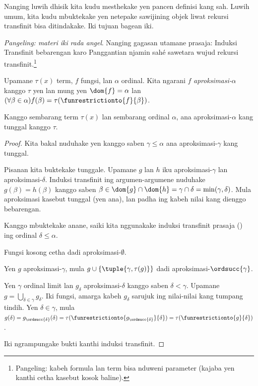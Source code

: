 \documentclass[../../../include/open-logic-section]{subfiles}
\begin{document}

Nanging luwih dhisik kita kudu mesthekake yen
 pancen definisi kang sah.
Luwih umum, kita kudu mbuktekake yen netepake
sawijining objek liwat rekursi transfinit bisa
ditindakake. Iki tujuan bagean iki.

\emph{Pangeling: materi iki rada angel}. Nanging
gagasan utamane prasaja: Induksi Transfinit bebarengan
karo Panggantian njamin sahé sawetara wujud rekursi
transfinit.\footnote{Pangeling: kabeh formula lan term
bisa nduweni parameter (kajaba yen kanthi cetha
kasebut kosok baline).}

\begin{defn}
	Upamane $\tau(x)$ term, $f$ fungsi, lan $\alpha$
	ordinal. Kita ngarani $f$ \emph{aproksimasi-$\alpha$}
	kanggo $\tau$ yen lan mung yen $\dom{f} = \alpha$
	lan $(\forall \beta \in \alpha)f(\beta)
	= \tau(\funrestrictionto{f}{\beta})$.
\end{defn}

\begin{lem}
Kanggo sembarang term $\tau(x)$ lan sembarang
ordinal $\alpha$, ana aproksimasi-$\alpha$ kang
tunggal kanggo $\tau$.
\end{lem}
\begin{proof}
Kita bakal nuduhake yen kanggo saben
$\gamma \leq \alpha$ ana aproksimasi-$\gamma$
kang tunggal.

Pisanan kita buktekake tunggale. Upamane $g$ lan $h$
iku aproksimasi-$\gamma$ lan aproksimasi-$\delta$.
Induksi transfinit ing argumen-argumene nuduhake
$g(\beta) = h(\beta)$ kanggo saben
$\beta \in \dom{g} \cap \dom{h}
= \gamma \cap \delta = \min(\gamma, \delta)$.
Mula aproksimasi kasebut tunggal (yen ana), lan
padha ing kabeh nilai kang dienggo bebarengan.

Kanggo mbuktekake anane, saiki kita nggunakake
induksi transfinit prasaja
()
ing ordinal $\delta \leq \alpha$.

Fungsi kosong cetha dadi aproksimasi-$\emptyset$.

Yen $g$ aproksimasi-$\gamma$, mula
$g \cup \{\tuple{\gamma, \tau(g)}\}$ dadi
aproksimasi-$\ordsucc{\gamma}$.

Yen $\gamma$ ordinal limit lan $g_\delta$
aproksimasi-$\delta$ kanggo saben $\delta < \gamma$.
Upamane $g = \bigcup_{\delta \in \gamma} g_\delta$.
Iki fungsi, amarga kabeh $g_\delta$ sarujuk
ing nilai-nilai kang tumpang tindih. Yen
$\delta \in \gamma$, mula
$g(\delta) = g_{\ordsucc{\delta}}(\delta)
= \tau(\funrestrictionto{g_{\ordsucc{\delta}}}{\delta})
= \tau(\funrestrictionto{g}{\delta})$.

Iki ngrampungake bukti kanthi induksi transfinit.
\end{proof}
\end{document}
